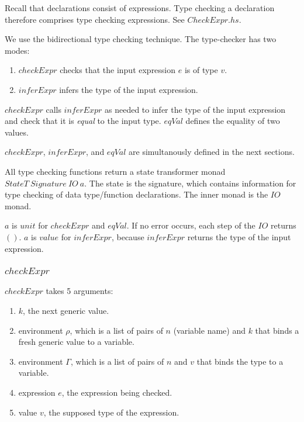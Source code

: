 \documentclass[acmsmall]{acmart}
\begin{document}
Recall that declarations consist of expressions. Type checking a declaration therefore comprises type checking expressions. See $CheckExpr.hs$. 

We use the bidirectional type checking technique. The type-checker has two modes:

\begin{enumerate}
  \item $checkExpr$ checks that the input expression $e$ is of type $v$.
  \item $inferExpr$ infers the type of the input expression.
\end{enumerate}

$checkExpr$ calls $inferExpr$ as needed to infer the type of the input expression and check that it is \emph{equal} to the input type. $eqVal$ defines the equality of two values.

$checkExpr$, $inferExpr$, and $eqVal$ are simultanously defined in the next sections. 

All type checking functions return a state transformer monad $StateT \: Signature \: IO \: a$. The state is the signature, which contains information for type checking of data type/function declarations. The inner monad is the $IO$ monad. 

$a$ is $unit$ for $checkExpr$ and $eqVal$. If no error occurs, each step of the $IO$ returns $\boldsymbol{()}$. $a$ is $value$ for $inferExpr$, because $inferExpr$ returns the type of the input expression.

\subsubsection{$checkExpr$}
\label{sec:checkExpr}

$checkExpr$ takes 5 arguments:

\begin{enumerate}
  \item $k$, the next generic value.
  \item environment $\rho$, which is a list of pairs of $n$ (variable name) and $k$ that binds a fresh generic value to a variable.
  \item environment $\Gamma$, which is a list of pairs of $n$ and $v$ that binds the type to a variable.
  \item expression $e$, the expression being checked.
  \item value $v$, the supposed type of the expression.
\end{enumerate}
\end{document}
